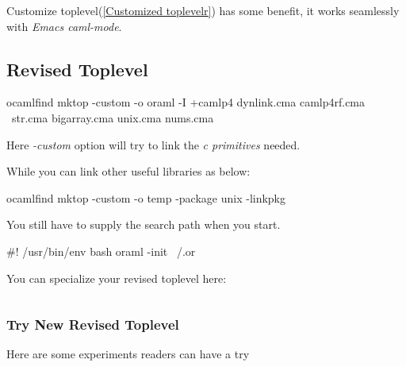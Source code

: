 
Customize toplevel(\ref{Customized toplevelr}) has some benefit, it
works seamlessly with \textit{Emacs caml-mode}.


\subsection{Revised Toplevel}
\begin{ocamlcode}
  ocamlfind mktop -custom -o oraml -I +camlp4 dynlink.cma camlp4rf.cma \
  str.cma bigarray.cma unix.cma nums.cma 
\end{ocamlcode}

Here \textit{-custom} option will try to link the \textit{c
  primitives} needed.

While you can link other useful libraries as below:

\begin{bashcode}
  ocamlfind mktop -custom -o temp -package unix -linkpkg
\end{bashcode}

You still have to supply the search path when you start.

\begin{bashcode}
#! /usr/bin/env bash
oraml -init ~/.or  
\end{bashcode}

You can specialize your revised toplevel here:

\inputminted[fontsize=\scriptsize]{ocaml}{homedir/.or}

\subsubsection{Try New Revised Toplevel}
\label{Try New Revised Toplevel}


Here are some experiments readers can have a try

